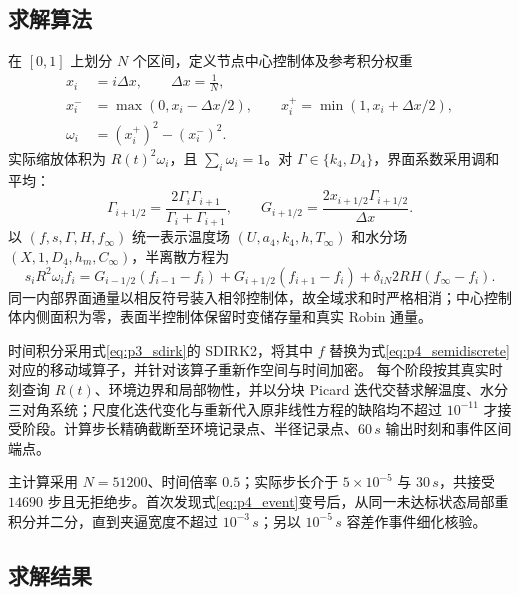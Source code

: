 \documentclass[withoutpreface,bwprint]{cumcmthesis}
\begin{document}
\subsection{求解算法}

在 $[0,1]$ 上划分 $N$ 个区间，定义节点中心控制体及参考积分权重
\begin{equation}
\begin{aligned}
x_i&=i\Delta x,\qquad \Delta x=\frac1N,\\
x_i^-&=\max(0,x_i-\Delta x/2),\qquad
x_i^+=\min(1,x_i+\Delta x/2),\\
\omega_i&=(x_i^+)^2-(x_i^-)^2.
\end{aligned}
\label{eq:p4_grid}
\end{equation}
实际缩放体积为 $R(t)^2\omega_i$，且 $\sum_i\omega_i=1$。对 $\Gamma\in\{k_4,D_4\}$，界面系数采用调和平均：
\begin{equation}
\Gamma_{i+1/2}=\frac{2\Gamma_i\Gamma_{i+1}}{\Gamma_i+\Gamma_{i+1}},\qquad
G_{i+1/2}=\frac{2x_{i+1/2}\Gamma_{i+1/2}}{\Delta x}.
\label{eq:p4_conductance}
\end{equation}
以 $(f,s,\Gamma,H,f_\infty)$ 统一表示温度场 $(U,a_4,k_4,h,T_\infty)$ 和水分场 $(X,1,D_4,h_m,C_\infty)$，半离散方程为
\begin{equation}
s_iR^2\omega_i\dot f_i
=G_{i-1/2}(f_{i-1}-f_i)+G_{i+1/2}(f_{i+1}-f_i)
+\delta_{iN}2RH(f_\infty-f_i).
\label{eq:p4_semidiscrete}
\end{equation}
同一内部界面通量以相反符号装入相邻控制体，故全域求和时严格相消；中心控制体内侧面积为零，表面半控制体保留时变储存量和真实 Robin 通量。

时间积分采用式\eqref{eq:p3_sdirk}的 SDIRK2，将其中 $f$ 替换为式\eqref{eq:p4_semidiscrete}对应的移动域算子，并针对该算子重新作空间与时间加密。
每个阶段按其真实时刻查询 $R(t)$、环境边界和局部物性，并以分块 Picard 迭代交替求解温度、水分三对角系统；尺度化迭代变化与重新代入原非线性方程的缺陷均不超过 $10^{-11}$ 才接受阶段。计算步长精确截断至环境记录点、半径记录点、$60\,\si{s}$ 输出时刻和事件区间端点。

主计算采用 $N=51200$、时间倍率 $0.5$；实际步长介于 $5\times10^{-5}$ 与 $30\,\si{s}$，共接受 $14690$ 步且无拒绝步。首次发现式\eqref{eq:p4_event}变号后，从同一未达标状态局部重积分并二分，直到夹逼宽度不超过 $10^{-3}\,\si{s}$；另以 $10^{-5}\,\si{s}$ 容差作事件细化核验。

\subsection{求解结果}
\end{document}
